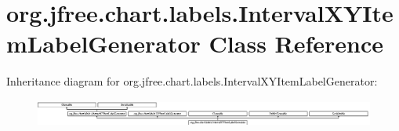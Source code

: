 \hypertarget{classorg_1_1jfree_1_1chart_1_1labels_1_1_interval_x_y_item_label_generator}{}\section{org.\+jfree.\+chart.\+labels.\+Interval\+X\+Y\+Item\+Label\+Generator Class Reference}
\label{classorg_1_1jfree_1_1chart_1_1labels_1_1_interval_x_y_item_label_generator}
Inheritance diagram for org.\+jfree.\+chart.\+labels.\+Interval\+X\+Y\+Item\+Label\+Generator\+:\begin{figure}[H]
\begin{center}
\leavevmode
\includegraphics[height=0.880503cm]{classorg_1_1jfree_1_1chart_1_1labels_1_1_interval_x_y_item_label_generator}
\end{center}
\end{figure}
